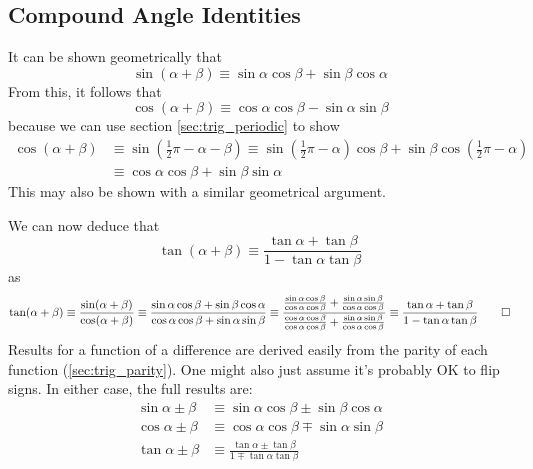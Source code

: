 \documentclass[fleqn,a4paper,11pt]{article}
\begin{document}
    \subsection{Compound Angle Identities} \label{sec:comp_angle}


    It can be shown geometrically that
    \begin{equation}
    \sin(\alpha + \beta) \equiv
       \sin \alpha \cos \beta +  \sin \beta \cos \alpha
    \end{equation}
    From this, it follows that
    \begin{equation}
    \cos(\alpha + \beta) \equiv
       \cos \alpha \cos \beta - \sin \alpha \sin \beta
    \end{equation}
    because we can use section \ref{sec:trig_periodic} to show
    \begin{align*}
    \cos(\alpha + \beta) &\equiv
        \sin(\frac 12 \pi - \alpha - \beta) \equiv
        \sin(\frac 12 \pi - \alpha)\cos \beta +
            \sin \beta \cos(\frac 12 \pi - \alpha) \\
    &\equiv
        \cos \alpha \cos \beta + \sin \beta \sin \alpha
    \end{align*}
    This may also be shown with a similar geometrical argument.

    We can now deduce that
    \begin{equation}
    \tan(\alpha + \beta) \equiv
        \frac{\tan \alpha + \tan \beta}{1 - \tan \alpha \tan \beta}
    \end{equation}
    as
    \begin{equation*}
    \tan(\alpha + \beta) \equiv
        \frac{\sin(\alpha + \beta)}{\cos(\alpha + \beta)} \equiv
        \frac{\sin \alpha \cos \beta + \sin \beta \cos \alpha}
             {\cos \alpha \cos \beta + \sin \alpha \sin \beta} \equiv
        \frac{\frac{\sin \alpha \cos \beta}{\cos \alpha \cos \beta} +
              \frac{\sin \alpha \sin \beta}{\cos \alpha \cos \beta}}
             {\frac{\cos \alpha \cos \beta}{\cos \alpha \cos \beta} +
              \frac{\sin \alpha \sin \beta}{\cos \alpha \cos \beta}}
             \equiv
        \frac{\tan \alpha + \tan \beta}{1 - \tan \alpha \tan \beta} \qed
    \end{equation*}
    Results for a function of a difference are derived easily from the parity of
    each function (\ref{sec:trig_parity}). One might also just assume it's
    probably OK to flip signs. In either case, the full results are:
    \begin{align}
    \sin \alpha \pm \beta &\equiv
       \sin \alpha \cos \beta \pm \sin \beta \cos \alpha \\
    \cos \alpha \pm \beta &\equiv
       \cos \alpha \cos \beta \mp \sin \alpha \sin \beta \\
    \tan \alpha \pm \beta &\equiv
        \frac{\tan \alpha \pm \tan \beta}{1 \mp \tan \alpha \tan \beta}
    \end{align}
\end{document}

